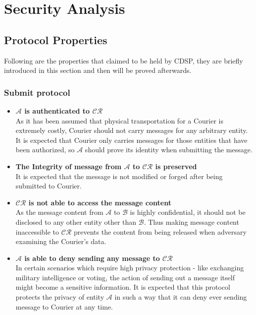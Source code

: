 \chapter{Security Analysis}
\section{Protocol Properties}
Following are the properties that claimed to be held by CDSP, they are briefly introduced in this section and then will be proved afterwards.
\subsection{Submit protocol}
\begin{itemize}
\item \textbf{$\mathcal{A}$ is authenticated to $\mathcal{CR}$} \\
As it has been assumed that physical transportation for a Courier is extremely costly, Courier should not carry messages for any arbitrary entity. It is expected that Courier only carries messages for those entities that have been authorized, so $ \mathcal{A} $ should prove its identity when submitting the message.

\item \textbf{The Integrity of message from $\mathcal{A}$ to $\mathcal{CR}$ is preserved} \\
It is expected that the message is not modified or forged after being submitted to Courier.

\item \textbf{$ \mathcal{CR}$ is not able to access the message content} \\
As the message content from $ \mathcal{A} $ to $ \mathcal{B} $ is highly confidential, it should not be disclosed to any other entity other than $ \mathcal{B} $. Thus making message content inaccessible to $ \mathcal{CR} $ prevents the content from being released when adversary examining the Courier's data.

\item \textbf{$\mathcal{A}$ is able to deny sending any message to $\mathcal{CR}$ } \\
In certain scenarios which require high privacy protection - like exchanging military intelligence or voting, the action of sending out a message itself might become a sensitive information. It is expected that this protocol protects the privacy of entity $ \mathcal{A} $ in such a way that it can deny ever sending message to Courier at any time.
\end{itemize}

